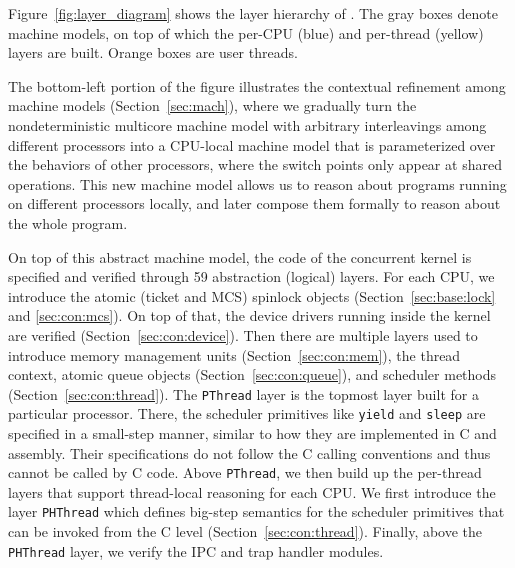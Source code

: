 
Figure~\ref{fig:layer_diagram} shows the layer hierarchy of  \cCTOS{}.
The gray boxes denote machine models, on top of which the
per-CPU (blue) and per-thread (yellow) layers are built. Orange boxes
are user threads.

The bottom-left portion of the figure illustrates the contextual refinement
among machine models (\cf Section~\ref{sec:mach}), where we gradually turn the nondeterministic
multicore machine model with arbitrary interleavings
among different processors into a CPU-local machine model that is parameterized
over the behaviors of other processors,
where the switch points only appear at shared operations. This new machine
model allows us to reason about programs running on different processors locally,
and later compose them formally to reason about the whole program.

On top of this abstract machine model, the code of the concurrent kernel is specified and 
verified through 59 abstraction (logical) layers. For each CPU,
we introduce the atomic (ticket and MCS) spinlock objects
(\cf Section~\ref{sec:base:lock} and \ref{sec:con:mcs}).
On top of that, the device drivers running inside the kernel are verified
(\cf Section~\ref{sec:con:device}).
Then there are multiple layers used to introduce memory management units (\cf Section~\ref{sec:con:mem}),
the thread context, atomic queue objects (\cf Section~\ref{sec:con:queue}), and scheduler methods (\cf Section~\ref{sec:con:thread}).
The \texttt{PThread} layer is the topmost layer built for a particular processor.
There, the scheduler primitives like \texttt{yield} and \texttt{sleep}
are specified in a small-step manner, similar to how they are implemented
in C and assembly. Their specifications do not follow the C calling conventions
and thus cannot be called by C code. Above \texttt{PThread}, we then build up the 
per-thread layers that support thread-local reasoning for each CPU.
We first introduce the layer \texttt{PHThread} which defines big-step semantics for
the scheduler primitives that can be invoked from the C level (\cf Section~\ref{sec:con:thread}).
Finally, above the \texttt{PHThread} layer, we verify the
IPC and trap handler modules.

